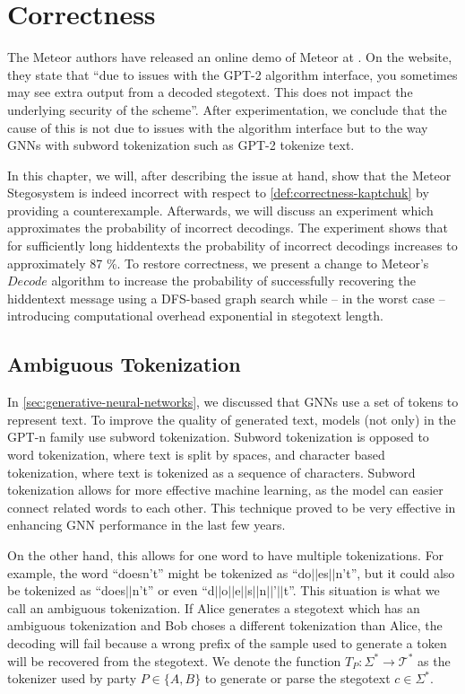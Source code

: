 \chapter{Correctness}
\label{chap:correctness}

The Meteor authors have released an online demo of Meteor at \cite{MeteorDemo2021}.
On the website, they state that ``due to issues with the GPT-2 algorithm interface, you sometimes may see extra output from a decoded stegotext. This does not impact the underlying security of the scheme''.
After experimentation, we conclude that the cause of this is not due to issues with the algorithm interface but to the way GNNs with subword tokenization such as GPT-2 tokenize text.

In this chapter, we will, after describing the issue at hand, show that the Meteor Stegosystem is indeed incorrect with respect to \autoref{def:correctness-kaptchuk} by providing a counterexample.
Afterwards, we will discuss an experiment which approximates the probability of incorrect decodings.
The experiment shows that for sufficiently long hiddentexts the probability of incorrect decodings increases to approximately 87 \%.
To restore correctness, we present a change to Meteor's $Decode$ algorithm to increase the probability of successfully recovering the hiddentext message using a DFS-based graph search while -- in the worst case -- introducing computational overhead exponential in stegotext length.

\section{Ambiguous Tokenization}
\label{sec:amb-tok}

In \autoref{sec:generative-neural-networks}, we discussed that GNNs use a set of tokens to represent text.
To improve the quality of generated text, models (not only) in the GPT-n family use subword tokenization.
Subword tokenization is opposed to word tokenization, where text is split by spaces, and character based tokenization, where text is tokenized as a sequence of characters.
Subword tokenization allows for more effective machine learning, as the model can easier connect related words to each other.
This technique proved to be very effective in enhancing GNN performance in the last few years.

On the other hand, this allows for one word to have multiple tokenizations.
For example, the word ``doesn't'' might be tokenized as ``do$||$es$||$n't'', but it could also be tokenized as ``does$||$n't'' or even ``d$||$o$||$e$||$s$||$n$||$'$||$t''.
This situation is what we call an ambiguous tokenization.
If Alice generates a stegotext which has an ambiguous tokenization and Bob choses a different tokenization than Alice, the decoding will fail because a wrong prefix of the sample used to generate a token will be recovered from the stegotext.
We denote the function $T_P \colon \Sigma^* \rightarrow \mathcal{T}^*$ as the tokenizer used by party $P \in \{A, B\}$ to generate or parse the stegotext $c \in \Sigma^*$.

